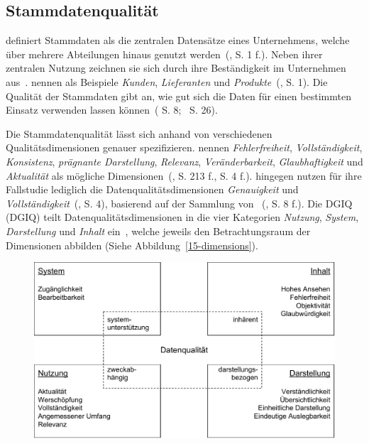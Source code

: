 \documentclass[
  language=german, %
  type=bachelor%
]{isthesis}
\begin{document}
\begin{content}
	\subsection{Stammdatenqualität} \textsc{\citeauthor{otto2012design}}
	definiert Stammdaten als die zentralen Datensätze eines Unternehmens, welche
	über mehrere Abteilungen hinaus genutzt werden~(\citeyear{otto2012design}, S.
	1 f.).  Neben ihrer zentralen Nutzung zeichnen sie sich durch ihre
	Beständigkeit im Unternehmen aus~\cite[][S.  1]{knolmayer2006quality}.
	\textsc{\citeauthor{knolmayer2006quality}} nennen als Beispiele
	\textit{Kunden}, \textit{Lieferanten} und
	\textit{Produkte}~(\citeyear{knolmayer2006quality}, S. 1). Die Qualität der
	Stammdaten gibt an, wie gut sich die Daten für einen bestimmten Einsatz
	verwenden lassen können~(\citeauthor{otto2011stammdatenmanagement}
	\citeyear{otto2011stammdatenmanagement} S.
	8;~\citeauthor{hinrichs2002datenqualitatsmanagement}
	\citeyear{hinrichs2002datenqualitatsmanagement} S. 26).

	Die Stammdatenqualität lässt sich anhand von verschiedenen
	Qualitätsdimensionen genauer spezifizieren.
	\textsc{\citeauthor{pipino2002data}} nennen \zB{} \textit{Fehlerfreiheit},
	\textit{Vollständigkeit}, \textit{Konsistenz}, \textit{prägnante
	Darstellung}, \textit{Relevanz}, \textit{Veränderbarkeit},
	\textit{Glaubhaftigkeit} und \textit{Aktualität} als mögliche
	Dimensionen~(\citeyear{pipino2002data, legner2007stammdaten}, S. 213 f., S. 4
	f.). \textsc{\citeauthor{baghi2013controlling}} hingegen nutzen für ihre
	Fallstudie lediglich die Datenqualitätsdimensionen \textit{Genauigkeit} und
	\textit{Vollständigkeit}~(\citeyear{baghi2013controlling}, S. 4), basierend
	auf der Sammlung von
	\textsc{\citeauthor{wand1996anchoring}}~(\citeyear{wand1996anchoring}, S. 8
	f.). Die \acrlong{DGIQ} (\acrshort{DGIQ}) teilt Datenqualitätsdimensionen in
	die vier Kategorien \textit{Nutzung}, \textit{System}, \textit{Darstellung}
	und \textit{Inhalt} ein~\cite[][S. 29 ff.]{rohweder2015informationsqualitat}, welche jeweils den Betrachtungsraum der Dimensionen
  abbilden (Siehe Abbildung~\ref{15-dimensions}).

  \begin{figure}[caption={Datenqualitätsdimensionen angeleht an~\cite{rohweder2015informationsqualitat} S. 30}, label={15-dimensions}]
    \includegraphics[scale=0.60]{content/figures/15-dimensions}
  \end{figure}


\end{content}
\end{document}
